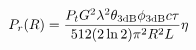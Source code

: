 \documentclass[preview]{standalone}
\begin{document}
\begin{align*}
\special{dvisvgm:raw <g id='unique000'>}P_r(R) = \frac{P_t G^2 \lambda^2 \theta_{\text{3dB}} \phi_{\text{3dB}} c\tau}{512 (2\ln 2) \pi^2 R^2 L} \eta\special{dvisvgm:raw </g>}
\end{align*}
\end{document}
